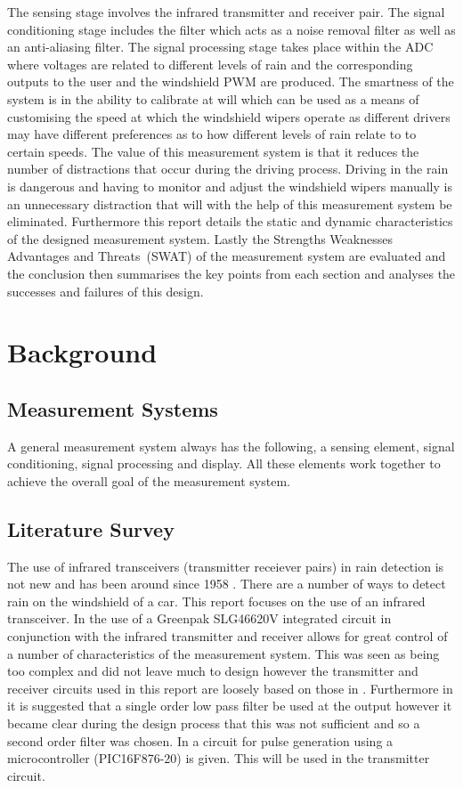 \documentclass[conference, 11pt]{IEEEtran}
\begin{document}
The sensing stage involves the infrared transmitter and receiver pair. The signal conditioning stage includes the filter which acts as a noise removal filter as well as an anti-aliasing filter. The signal processing stage takes place within the ADC where voltages are related to different levels of rain and the corresponding outputs to the user and the windshield PWM are produced. The smartness of the system is in the ability to calibrate at will which can be used as a means of customising the speed at which the windshield wipers operate as different drivers may have different preferences as to how different levels of rain relate to to certain speeds. The value of this measurement system is that it reduces the number of distractions that occur during the driving process. Driving in the rain is dangerous and having to monitor and adjust the windshield wipers manually is an unnecessary distraction that will with the help of this measurement system be eliminated. Furthermore this report details the static and dynamic characteristics of the designed measurement system. Lastly the Strengths Weaknesses Advantages and Threats~(SWAT) of the measurement system are evaluated and the conclusion then summarises the key points from each section and analyses the successes and failures of this design. 

\section{Background}
	
	
	
\subsection{Measurement Systems}
A general measurement system always has the following, a sensing element, signal conditioning, signal processing and display. All these elements work together to achieve the overall goal of the measurement system.
	
\subsection{Literature Survey}
The use of infrared transceivers (transmitter receiever pairs) in rain detection is not new and has been around since 1958 \cite{SENS}. There are a number of ways to detect rain on the windshield of a car. This report focuses on the use of an infrared transceiver. In \cite{NOTE} the use of a Greenpak SLG46620V integrated circuit in conjunction with the infrared transmitter and receiver allows for great control of a number of characteristics of the measurement system. This was seen as being too complex and did not leave much to design however the transmitter and receiver circuits used in this report are loosely based on those in \cite{NOTE}. 
Furthermore in \cite{NOTE} it is suggested that a single order low pass filter be used at the output however it became clear during the design process that this was not sufficient and so a second order filter was chosen. In
\cite{PULSE} a circuit for pulse generation using a microcontroller (PIC16F876-20) is given. This will be used in the transmitter circuit. 
\end{document}
